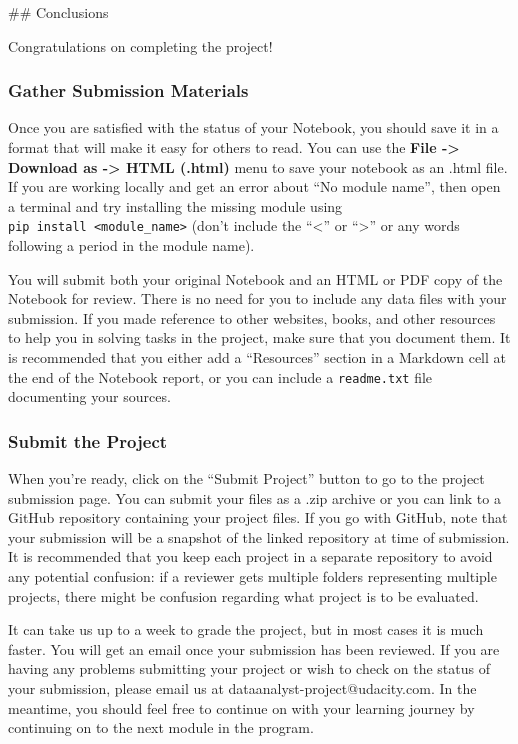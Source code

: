 \documentclass[11pt]{article}
\begin{document}
     \#\# Conclusions

Congratulations on completing the project!

\hypertarget{gather-submission-materials}{%
\subsubsection{Gather Submission
Materials}\label{gather-submission-materials}}

Once you are satisfied with the status of your Notebook, you should save
it in a format that will make it easy for others to read. You can use
the \textbf{File -\textgreater{} Download as -\textgreater{} HTML
(.html)} menu to save your notebook as an .html file. If you are working
locally and get an error about ``No module name'', then open a terminal
and try installing the missing module using
\texttt{pip\ install\ \textless{}module\_name\textgreater{}} (don't
include the ``\textless{}'' or ``\textgreater{}'' or any words following
a period in the module name).

You will submit both your original Notebook and an HTML or PDF copy of
the Notebook for review. There is no need for you to include any data
files with your submission. If you made reference to other websites,
books, and other resources to help you in solving tasks in the project,
make sure that you document them. It is recommended that you either add
a ``Resources'' section in a Markdown cell at the end of the Notebook
report, or you can include a \texttt{readme.txt} file documenting your
sources.

\hypertarget{submit-the-project}{%
\subsubsection{Submit the Project}\label{submit-the-project}}

When you're ready, click on the ``Submit Project'' button to go to the
project submission page. You can submit your files as a .zip archive or
you can link to a GitHub repository containing your project files. If
you go with GitHub, note that your submission will be a snapshot of the
linked repository at time of submission. It is recommended that you keep
each project in a separate repository to avoid any potential confusion:
if a reviewer gets multiple folders representing multiple projects,
there might be confusion regarding what project is to be evaluated.

It can take us up to a week to grade the project, but in most cases it
is much faster. You will get an email once your submission has been
reviewed. If you are having any problems submitting your project or wish
to check on the status of your submission, please email us at
dataanalyst-project@udacity.com. In the meantime, you should feel free
to continue on with your learning journey by continuing on to the next
module in the program.


    
    
    
    
\end{document}
